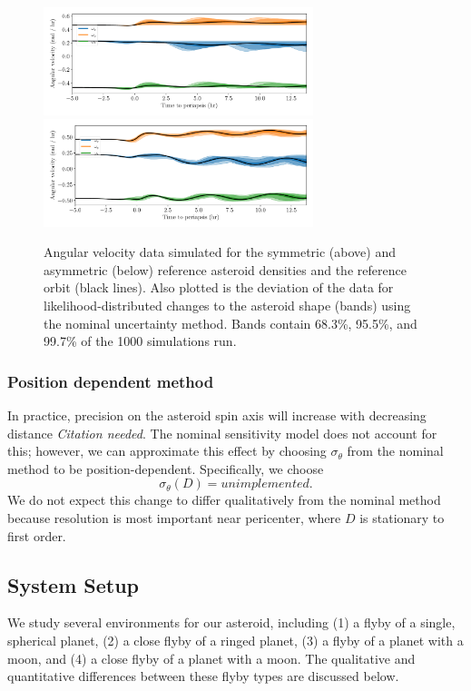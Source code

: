 \documentclass{aastex631}
\newcommand{\jtd}[1]{{\color{red}\textit{#1}}}
\begin{document}
\begin{figure}
  \centering
  \includegraphics[width=0.7\textwidth]{nominal-data-sym.pdf}
  \includegraphics[width=0.7\textwidth]{nominal-data-asym.pdf}
  \caption{Angular velocity data simulated for the symmetric (above) and asymmetric (below) reference asteroid densities and the reference orbit (black lines). Also plotted is the deviation of the data for likelihood-distributed changes to the asteroid shape (bands) using the nominal uncertainty method. Bands contain 68.3\%, 95.5\%, and 99.7\% of the 1000 simulations run.}
  \label{fig:example-data}
\end{figure}


\subsubsection{Position dependent method}
In practice, precision on the asteroid spin axis will increase with decreasing distance \jtd{Citation needed}. The nominal sensitivity model does not account for this; however, we can approximate this effect by choosing $\sigma_\theta$ from the nominal method to be position-dependent. Specifically, we choose
\begin{equation}
\sigma_\theta(D) = unimplemented.
\label{eqn:pos-dependent-sensitivity}
\end{equation}
We do not expect this change to differ qualitatively from the nominal method because resolution is most important near pericenter, where $D$ is stationary to first order.



\subsection{System Setup}
We study several environments for our asteroid, including (1) a flyby of a single, spherical planet, (2) a close flyby of a ringed planet, (3) a flyby of a planet with a moon, and (4) a close flyby of a planet with a moon. The qualitative and quantitative differences between these flyby types are discussed below.
\end{document}
